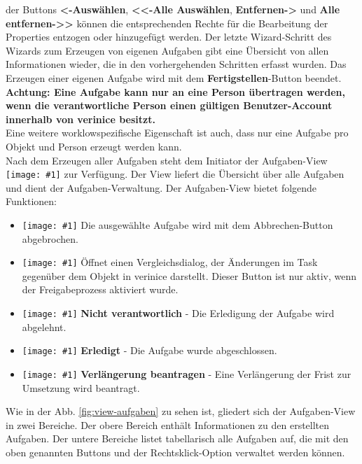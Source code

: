 \documentclass[a4paper,10pt]{book}
\newcommand{\icon}[1]{\texttt{[image: \#1]}}
\begin{document}
der Buttons \textbf{\textless-Auswählen}, \textbf{\textless\textless-Alle Auswählen}, \textbf{Entfernen-\textgreater} und \textbf{Alle entfernen-\textgreater\textgreater} können die entsprechenden
Rechte für die Bearbeitung der Properties entzogen oder hinzugefügt werden.
Der letzte Wizard-Schritt des Wizards zum Erzeugen von eigenen Aufgaben gibt eine Übersicht von allen Informationen wieder, die in den vorhergehenden Schritten erfasst wurden.
Das Erzeugen einer eigenen Aufgabe wird mit dem \textbf{Fertigstellen}-Button beendet.
\newline\\
\textbf{Achtung: Eine Aufgabe kann nur an eine Person übertragen werden, wenn die verantwortliche Person einen gültigen Benutzer-Account innerhalb von verinice besitzt.}
\newline\\
Eine weitere worklowspezifische Eigenschaft ist auch, dass nur eine Aufgabe pro Objekt und Person erzeugt werden kann.
\newline\\
Nach dem Erzeugen aller Aufgaben steht dem Initiator der Aufgaben-View \icon{Icon/Tasks.png} zur Verfügung. Der View liefert die Übersicht über alle Aufgaben und dient der Aufgaben-Verwaltung.  Der Aufgaben-View bietet folgende Funktionen:
\begin{itemize}
\item \icon{Icon/Nein.png} Die ausgewählte
  Aufgabe wird mit dem Abbrechen-Button abgebrochen.
\item \icon{Icon/history_rep.png} Öffnet einen
  Vergleichsdialog, der Änderungen im Task gegenüber dem Objekt in
  verinice darstellt. Dieser Button ist nur aktiv, wenn der
  Freigabeprozess aktiviert wurde.
  \item \icon{Icon/16-em-check.png} \textbf{Nicht verantwortlich} - Die Erledigung der Aufgabe wird abgelehnt.
  \item \icon{Icon/16-em-check.png} \textbf{Erledigt} - Die Aufgabe wurde abgeschlossen.
  \item \icon{Icon/16-em-check.png} \textbf{Verlängerung beantragen} - Eine Verlängerung der Frist zur Umsetzung wird beantragt.
\end{itemize}
Wie in der Abb. \ref{fig:view-aufgaben} zu sehen ist, gliedert sich der Aufgaben-View in zwei Bereiche. Der obere Bereich enthält Informationen zu den erstellten Aufgaben. Der untere Bereiche listet tabellarisch alle Aufgaben auf, die mit den oben genannten Buttons und der Rechtsklick-Option verwaltet werden können.
\end{document}
